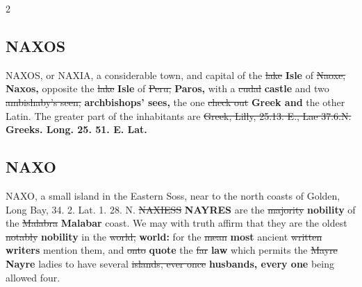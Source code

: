 \documentclass[10pt]{article}
\begin{document}
\begin{multicols}{2}
\subsection*{NAXOS}
NAXOS, or NAXIA, a considerable town, and capital of the \sout{lake} \textbf{Isle} of \sout{Naoxe,} \textbf{Naxos,} opposite the \sout{lake} \textbf{Isle} of \sout{Peru,} \textbf{Paros,} with a \sout{cudal} \textbf{castle} and two \sout{ambishaby’s seen,} \textbf{archbishops' sees,} the one \sout{check out} \textbf{Greek and} the other Latin. The greater part of the inhabitants are \sout{Greek, Lilly, 25.13. E., Lae 37.6.N.} \textbf{Greeks. Long. 25. 51. E. Lat.}

\subsection*{NAXO}
NAXO, a small island in the Eastern Soss, near to the north coasts of Golden, Long Bay, 34. 2. Lat. 1. 28. N. \sout{NAXIESS} \textbf{NAYRES} are the \sout{majority} \textbf{nobility} of the \sout{Malabra} \textbf{Malabar} coast. We may with truth affirm that they are the oldest \sout{notably} \textbf{nobility} in the \sout{world,} \textbf{world:} for the \sout{mean} \textbf{most} ancient \sout{written} \textbf{writers} mention them, and \sout{onto} \textbf{quote} the \sout{far} \textbf{law} which permits the \sout{Mayre} \textbf{Nayre} ladies to have several \sout{islands, ever once} \textbf{husbands, every one} being allowed four.


\end{multicols}
\end{document}
